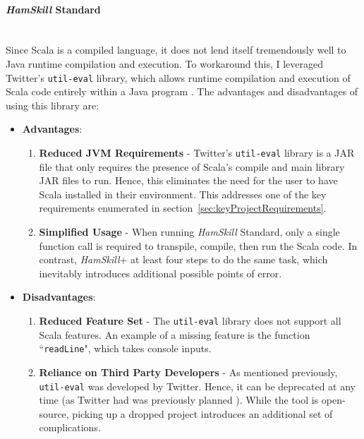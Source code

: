 \documentclass{report}
\newcommand{\myparagraph}[1]{\paragraph{#1}\mbox{}\\}
\begin{document}
\myparagraph{\textit{HamSkill} Standard}

Since Scala is a compiled language, it does not lend itself tremendously well to Java runtime compilation and execution.  To workaround this, I leveraged Twitter's \texttt{util-eval} library, which allows runtime compilation and execution of Scala code entirely within a Java program \cite{githubTwitterEvalUtil}.  The advantages and disadvantages of using  this library are:

\begin{itemize}

\item \textbf{Advantages}:

\begin{enumerate}

\item \textbf{Reduced JVM Requirements} - Twitter's \texttt{util-eval} library is a JAR file that only requires the presence of Scala's compile and main library JAR files to run.  Hence, this eliminates the need for the user to have Scala installed in their environment.  This addresses one of the key requirements enumerated in section~\ref{sec:keyProjectRequirements}.

\item \textbf{Simplified Usage} - When running \textit{HamSkill} Standard, only a single function call is required to transpile, compile, then run the Scala code.  In contrast, \textit{HamSkill}+ at least four steps to do the same task, which inevitably introduces additional possible points of error.

\end{enumerate}

\item \textbf{Disadvantages}:

\begin{enumerate}

\item \textbf{Reduced Feature Set} - The \texttt{util-eval} library does not support all Scala features.  An example of a missing feature is the function ``\texttt{readLine}", which takes console inputs.

\item \textbf{Reliance on Third Party Developers} - As mentioned previously, \texttt{util-eval} was developed by Twitter.  Hence, it can be deprecated at any time (as Twitter had was previously planned \cite{deprecateUtilEval}).  While the tool is open-source, picking up a dropped project introduces an additional set of complications.

\end{enumerate}

\end{itemize}
\end{document}
